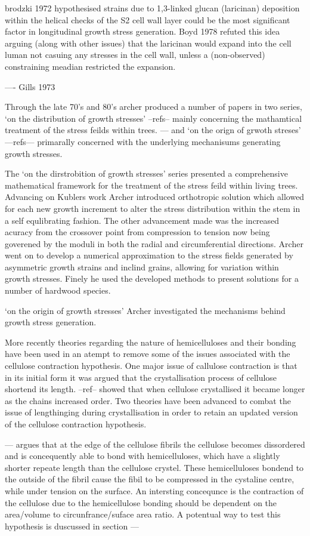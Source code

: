 \documentclass{article}
\begin{document}
brodzki 1972 hypothesised strains due to 1,3-linked glucan (laricinan)
deposition within the helical checks of the S2 cell wall layer could be the
most significant factor in longitudinal growth stress generation. Boyd 1978
refuted this idea arguing (along with other issues) that the laricinan would
expand into the cell luman not casuing any stresses in the cell wall, unless a
(non-observed) constraining meadian restricted the expansion.

---- Gills 1973

Through the late 70's and 80's archer produced a number of papers in two series,
`on the distribution of growth stresses' --refs-- mainly concerning the
mathamtical treatment of the stress feilds within trees. --- and `on the
orign of grwoth streses' ---refs--- primarally concerned with the underlying
mechanisums generating growth stresses.

The `on the dirstrobition of growth stresses' series presented a comprehensive
mathematical framework for the treatment of the stress feild within living
trees. Advancing on Kublers work Archer introduced orthotropic solution which
allowed for each new growth increment to alter the stress distribution within
the stem in a self equlibrating fashion. The other advancement made was the
increased acuracy from the crossover point from compression to tension now being
goverened by the moduli in both the radial and circumferential directions.
Archer went on to develop a numerical approximation to the stress fields
generated by asymmetric growth strains and inclind grains, allowing for
variation within growth stresses. Finely he used the developed methods to
present solutions for a number of hardwood species.

`on the origin of growth stresses' Archer investigated the mechanisms behind
growth stress generation.

More recently theories regarding the nature of hemicelluloses and their bonding
have been used in an atempt to remove some of the issues associated with the
cellulose contraction hypothesis. One major issue of callulose contraction is
that in its initial form it was argued that the crystallisation process of cellulose
shortend its length. --ref-- showed that when cellulose crystallised it became
longer as the chains increased order. Two theories have been advanced to combat
the issue of lengthinging during crystallisation in order to retain an updated
version of the cellulose contraction hypothesis.

--- argues that at the edge of the cellulose fibrils the cellulose becomes
dissordered and is concequently able to bond with hemicelluloses, which have a
slightly shorter repeate length than the cellulose crystel. These hemicelluloses
bondend to the outside of the fibril cause the fibil to be compressed in the
cystaline centre, while under tension on the surface. An intersting concequnce
is the contraction of the cellulose due to the hemicellulose bonding should be
dependent on the area/volume to circunfrance/suface area ratio. A potentual way
to test this hypothesis is duscussed in section ---
\end{document}
